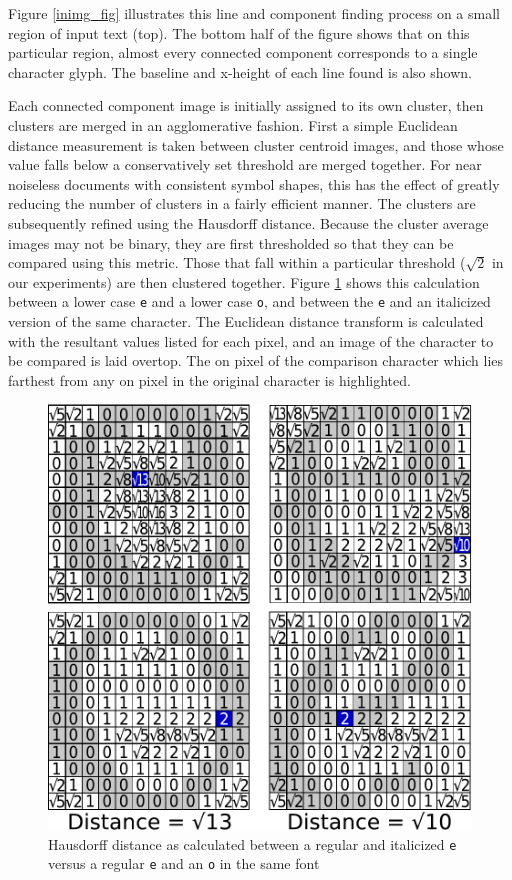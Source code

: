 \documentclass[times, 10pt,twocolumn]{article}
\begin{document}
Figure \ref{inimg_fig} illustrates this line and component finding process on a
small region of input text (top).  The bottom half of the figure shows that on
this particular region, almost every connected component corresponds to a
single character glyph.  The baseline and x-height of each line found is also
shown.

Each connected component image is initially assigned to its own cluster, then
clusters are merged in an agglomerative fashion.  First a simple Euclidean
distance measurement is taken between cluster centroid images, and those whose
value falls below a conservatively set threshold are merged together.  For near
noiseless documents with consistent symbol shapes, this has the effect of 
greatly reducing the number of clusters in a fairly efficient manner.
The clusters are subsequently refined using the
Hausdorff distance\cite{rucklidge1996}.  Because the cluster average images 
may not be binary, they are first thresholded so that they can be compared using
this metric.  Those that fall within a particular threshold ($\sqrt 2$ in our
experiments) are then clustered together.  Figure \ref{hausdist_fig}
shows this calculation between a lower case {\tt e} and a lower case {\tt o}, 
and between the {\tt e} and an italicized version of the same character.  The 
Euclidean distance transform is calculated with the resultant values listed for 
each pixel, and an image of the character to be compared is laid overtop.  The 
on pixel of the comparison character which lies farthest from any on pixel in 
the original character is highlighted. 

\begin{figure}[ht]
  \centering
  \includegraphics[scale=.4]{figures/haus_dist_comparisons}
  \caption{Hausdorff distance as calculated between a regular and italicized
  {\tt e} versus a regular {\tt e} and an {\tt o} in the same font}
  \label{hausdist_fig}
\end{figure}
\end{document}
